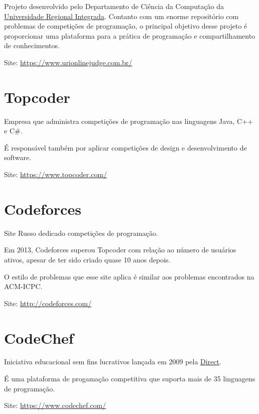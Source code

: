 Projeto desenvolvido pelo Departamento de Ciência da Computação da \href{http://www.uri.br/}{Universidade Regional Integrada}.
Contanto com um enorme repositório com problemas de competições de programação, o principal objetivo desse projeto é proporcionar uma 
plataforma para a prática de programação e compartilhamento de conhecimentos.

Site: \href{https://www.urionlinejudge.com.br/}{https://www.urionlinejudge.com.br/}

\section{Topcoder} 

Empresa que administra competições de programação nas linguagens Java, C++ e C$\#$.

É responsável também por aplicar competições de design e desenvolvimento de software.

Site: \href{https://www.topcoder.com/}{https://www.topcoder.com/}

\section{Codeforces}

Site Russo dedicado competições de programação. 

Em 2013, Codeforces superou Topcoder com relação ao número de usuários ativos, apesar de ter sido criado quase 10 anos depois.

O estilo de problemas que esse site aplica é similar aos problemas encontrados na ACM-ICPC.

Site: \href{http://codeforces.com/}{http://codeforces.com/}

\section{CodeChef}

Iniciativa educacional sem fins lucrativos lançada em 2009 pela \href{http://www.directi.com/}{Direct}.

É uma plataforma de progamação competitiva que suporta mais de 35 linguagens de programação.

Site: \href{https://www.codechef.com/}{https://www.codechef.com/}


